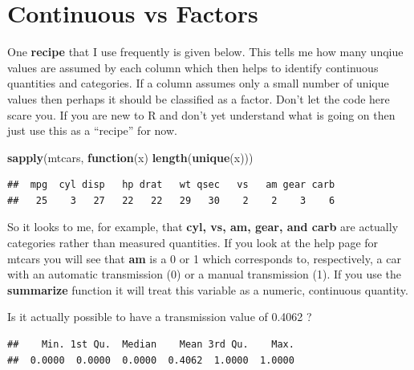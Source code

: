 \documentclass[]{book}
\newenvironment{Shaded}{\begin{snugshade}}{\end{snugshade}}
\newcommand{\ControlFlowTok}[1]{\textcolor[rgb]{0.13,0.29,0.53}{\textbf{#1}}}
\newcommand{\KeywordTok}[1]{\textcolor[rgb]{0.13,0.29,0.53}{\textbf{#1}}}
\newcommand{\NormalTok}[1]{#1}
\newcommand{\OperatorTok}[1]{\textcolor[rgb]{0.81,0.36,0.00}{\textbf{#1}}}
\begin{document}
\hypertarget{continuous-vs-factors}{%
\section{Continuous vs Factors}\label{continuous-vs-factors}}

One \textbf{recipe} that I use frequently is given below. This tells me how many unqiue values are assumed by each column which then helps to identify continuous quantities and categories. If a column assumes only a small number of unique values then perhaps it should be classified as a factor. Don't let the code here scare you. If you are new to R and don't yet understand what is going on then just use this as a ``recipe'' for now.

\begin{Shaded}
\begin{Highlighting}[]
\KeywordTok{sapply}\NormalTok{(mtcars, }\ControlFlowTok{function}\NormalTok{(x) }\KeywordTok{length}\NormalTok{(}\KeywordTok{unique}\NormalTok{(x)))}
\end{Highlighting}
\end{Shaded}

\begin{verbatim}
##  mpg  cyl disp   hp drat   wt qsec   vs   am gear carb 
##   25    3   27   22   22   29   30    2    2    3    6
\end{verbatim}

So it looks to me, for example, that \textbf{cyl, vs, am, gear, and carb} are actually categories rather than measured quantities. If you look at the help page for mtcars you will see that \textbf{am} is a 0 or 1 which corresponds to, respectively, a car with an automatic transmission (0) or a manual transmission (1). If you use the \textbf{summarize} function it will treat this variable as a numeric, continuous quantity.

Is it actually possible to have a transmission value of 0.4062 ?

\begin{Shaded}
\end{Shaded}

\begin{verbatim}
##    Min. 1st Qu.  Median    Mean 3rd Qu.    Max. 
##  0.0000  0.0000  0.0000  0.4062  1.0000  1.0000
\end{verbatim}
\end{document}
